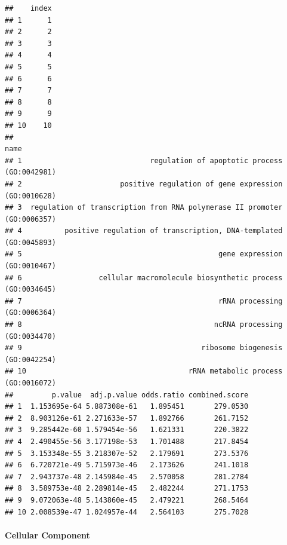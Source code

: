 \documentclass[
]{article}
\begin{document}
\begin{verbatim}
##    index
## 1      1
## 2      2
## 3      3
## 4      4
## 5      5
## 6      6
## 7      7
## 8      8
## 9      9
## 10    10
##                                                                        name
## 1                              regulation of apoptotic process (GO:0042981)
## 2                       positive regulation of gene expression (GO:0010628)
## 3  regulation of transcription from RNA polymerase II promoter (GO:0006357)
## 4          positive regulation of transcription, DNA-templated (GO:0045893)
## 5                                              gene expression (GO:0010467)
## 6                  cellular macromolecule biosynthetic process (GO:0034645)
## 7                                              rRNA processing (GO:0006364)
## 8                                             ncRNA processing (GO:0034470)
## 9                                          ribosome biogenesis (GO:0042254)
## 10                                      rRNA metabolic process (GO:0016072)
##         p.value  adj.p.value odds.ratio combined.score
## 1  1.153695e-64 5.887308e-61   1.895451       279.0530
## 2  8.903126e-61 2.271633e-57   1.892766       261.7152
## 3  9.285442e-60 1.579454e-56   1.621331       220.3822
## 4  2.490455e-56 3.177198e-53   1.701488       217.8454
## 5  3.153348e-55 3.218307e-52   2.179691       273.5376
## 6  6.720721e-49 5.715973e-46   2.173626       241.1018
## 7  2.943737e-48 2.145984e-45   2.570058       281.2784
## 8  3.589753e-48 2.289814e-45   2.482244       271.1753
## 9  9.072063e-48 5.143860e-45   2.479221       268.5464
## 10 2.008539e-47 1.024957e-44   2.564103       275.7028
\end{verbatim}

\hypertarget{cellular-component}{%
\paragraph{Cellular Component}\label{cellular-component}}
\end{document}
